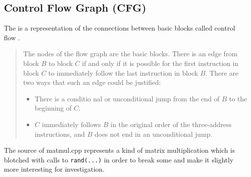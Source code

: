 \subsection{Control Flow Graph (CFG)}\label{subsec:cfg}
The \cfg is a representation of the connections between basic blocks called control flow \cite[chapter 8.4.3, p.~529]{Drachenbuch}.

\begin{quotation}\noindent
    \grqq The nodes of the flow graph are the basic blocks.
    There is an edge from block \(B\) to block \(C\) if and only if it is possible for the first instruction in block \(C\) to immediately follow the last instruction in block \(B\).
    There are two ways that such an edge could be justified:
    \begin{itemize}
        \item There is a conditio nal or unconditional jump from the end of \(B\) to the beginning of \(C\).
        \item \(C\) immediately follows \(B\) in the original order of the three-address instructions, and \(B\) does not end in an unconditional jump.\grqq
    \end{itemize}
\end{quotation}
\begin{code}
    \caption[Source of matmul.cpp]{The source of matmul.cpp represents a kind of matrix multiplication which is blotched with calls to \texttt{rand(...)} in order to break some \scops and make it slightly more interesting for investigation.}
    \inputminted{c++}{cpp/matmul.cpp}
    \label{lst:matmulcpp}
\end{code}
